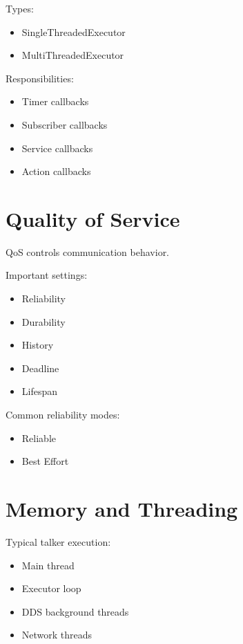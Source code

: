 \documentclass[11pt]{article}
\begin{document}
Types:

\begin{itemize}
\item SingleThreadedExecutor
\item MultiThreadedExecutor
\end{itemize}

Responsibilities:

\begin{itemize}
\item Timer callbacks
\item Subscriber callbacks
\item Service callbacks
\item Action callbacks
\end{itemize}

\section{Quality of Service}

QoS controls communication behavior.

Important settings:

\begin{itemize}
\item Reliability
\item Durability
\item History
\item Deadline
\item Lifespan
\end{itemize}

Common reliability modes:

\begin{itemize}
\item Reliable
\item Best Effort
\end{itemize}

\section{Memory and Threading}

Typical talker execution:

\begin{itemize}
\item Main thread
\item Executor loop
\item DDS background threads
\item Network threads
\end{itemize}
\end{document}
